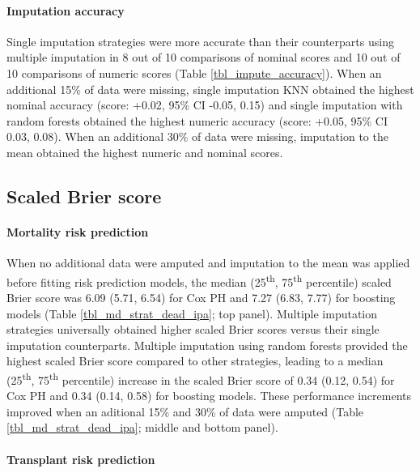 \documentclass{article}
\begin{document}
\paragraph{Imputation accuracy}

Single imputation strategies were more accurate than their counterparts
using multiple imputation in 8 out of 10 comparisons of nominal scores
and 10 out of 10 comparisons of numeric scores (Table
\ref{tbl_impute_accuracy}). When an additional 15\% of data were
missing, single imputation KNN obtained the highest nominal accuracy
(score: +0.02, 95\% CI -0.05, 0.15) and single imputation with random
forests obtained the highest numeric accuracy (score: +0.05, 95\% CI
0.03, 0.08). When an additional 30\% of data were missing, imputation to
the mean obtained the highest numeric and nominal scores.

\hypertarget{scaled-brier-score}{%
\subsection{Scaled Brier score}\label{scaled-brier-score}}

\paragraph{Mortality risk prediction}

When no additional data were amputed and imputation to the mean was
applied before fitting risk prediction models, the median
(25\textsuperscript{th}, 75\textsuperscript{th} percentile) scaled Brier
score was 6.09 (5.71, 6.54) for Cox PH and 7.27 (6.83, 7.77) for
boosting models (Table \ref{tbl_md_strat_dead_ipa}; top panel). Multiple
imputation strategies universally obtained higher scaled Brier scores
versus their single imputation counterparts. Multiple imputation using
random forests provided the highest scaled Brier score compared to other
strategies, leading to a median (25\textsuperscript{th},
75\textsuperscript{th} percentile) increase in the scaled Brier score of
0.34 (0.12, 0.54) for Cox PH and 0.34 (0.14, 0.58) for boosting models.
These performance increments improved when an aditional 15\% and 30\% of
data were amputed (Table \ref{tbl_md_strat_dead_ipa}; middle and bottom
panel).

\paragraph{Transplant risk prediction}
\end{document}
